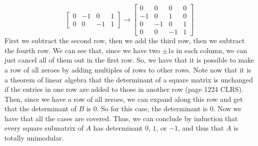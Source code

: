 \documentclass{article}
\begin{document}
\begin{description}
\[\begin{bmatrix}
         0 & -1 & 0 & 1\\
         0 & 0 & -1 & 1
        \end{bmatrix} \rightarrow
        \begin{bmatrix}
         0 & 0 & 0 & 0\\
        -1 & 0 & 1 & 0\\
         0 & -1 & 0 & 1\\
         0 & 0 & -1 & 1
        \end{bmatrix}
        \]
        First we subtract the second row, then we add the third row, then we
        subtract the fourth row. We can see that, since we have two $\pm1$s in
        each column, we can just cancel all of them out in the first row.
        So, we have that it is possible to make a row of all zeroes by adding
        multiples of rows to other rows. Note now that it is a theorem of linear
        algebra that the determinant of a square matrix is unchanged if the
        entries in one row are added to those in another row (page 1224 CLRS).
        Then, since we have a row of all zeroes, we can expand along this row
        and get that the determinant of $B$ is $0$. So for this case, the determinant
        is $0$. Now we have that all the cases are covered. Thus, we can
        conclude by induction that every square submatrix of $A$ has determinant
        $0$, $1$, or $-1$, and thus that $A$ is totally unimodular.


\end{description}
\end{document}
